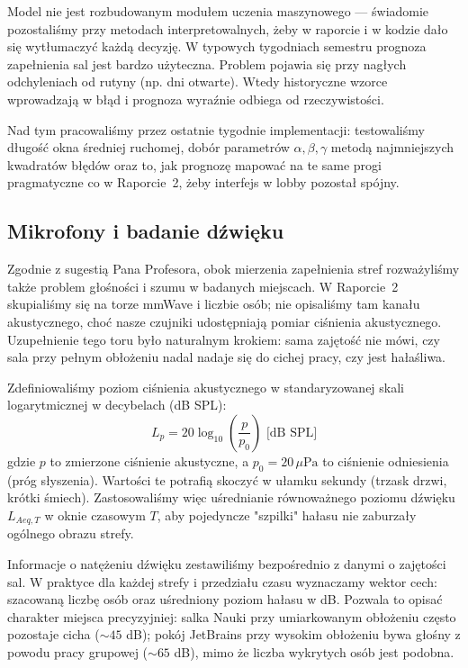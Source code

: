 \documentclass[14pt,a4paper]{extarticle}
\begin{document}
Model nie jest rozbudowanym modułem uczenia maszynowego --- świadomie pozostaliśmy przy metodach interpretowalnych, żeby w raporcie i w kodzie dało się wytłumaczyć każdą decyzję. W typowych tygodniach semestru prognoza zapełnienia sal jest bardzo użyteczna. Problem pojawia się przy nagłych odchyleniach od rutyny (np. dni otwarte). Wtedy historyczne wzorce wprowadzają w błąd i prognoza wyraźnie odbiega od rzeczywistości.

Nad tym pracowaliśmy przez ostatnie tygodnie implementacji: testowaliśmy długość okna średniej ruchomej, dobór parametrów $\alpha, \beta, \gamma$ metodą najmniejszych kwadratów błędów oraz to, jak prognozę mapować na te same progi pragmatyczne co w Raporcie~2, żeby interfejs w lobby pozostał spójny.

\subsection{Mikrofony i badanie dźwięku}
Zgodnie z sugestią Pana Profesora, obok mierzenia zapełnienia stref rozważyliśmy także problem głośności i szumu w badanych miejscach. W Raporcie~2 skupialiśmy się na torze mmWave i liczbie osób; nie opisaliśmy tam kanału akustycznego, choć nasze czujniki udostępniają pomiar ciśnienia akustycznego. Uzupełnienie tego toru było naturalnym krokiem: sama zajętość nie mówi, czy sala przy pełnym obłożeniu nadal nadaje się do cichej pracy, czy jest hałaśliwa.

Zdefiniowaliśmy poziom ciśnienia akustycznego w standaryzowanej skali logarytmicznej w decybelach (dB SPL):
\begin{equation}
    L_p = 20 \log_{10} \left( \frac{p}{p_0} \right) \text{ [dB SPL]}
\end{equation}
gdzie $p$ to zmierzone ciśnienie akustyczne, a $p_0 = 20\,\mu\text{Pa}$ to ciśnienie odniesienia (próg słyszenia). Wartości te potrafią skoczyć w ułamku sekundy (trzask drzwi, krótki śmiech). Zastosowaliśmy więc uśrednianie równoważnego poziomu dźwięku $L_{Aeq,T}$ w oknie czasowym $T$, aby pojedyncze "szpilki" hałasu nie zaburzały ogólnego obrazu strefy.

Informacje o natężeniu dźwięku zestawiliśmy bezpośrednio z danymi o zajętości sal. W praktyce dla każdej strefy i przedziału czasu wyznaczamy wektor cech: szacowaną liczbę osób oraz uśredniony poziom hałasu w dB. Pozwala to opisać charakter miejsca precyzyjniej: salka Nauki przy umiarkowanym obłożeniu często pozostaje cicha ($\sim 45$ dB); pokój JetBrains przy wysokim obłożeniu bywa głośny z powodu pracy grupowej ($\sim 65$ dB), mimo że liczba wykrytych osób jest podobna. 
\end{document}
